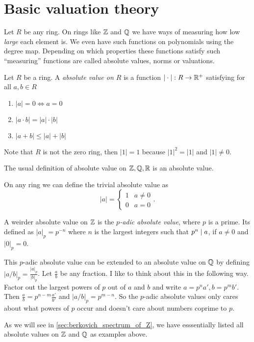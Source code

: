 
\section{Basic valuation theory} \label{sec:basic_valuation_theory}

Let $R$ be any ring. On rings like $\mathbb{Z}$ and $\mathbb{Q}$ we have ways of measuring how low \emph{large} each element is. We even have such functions on polynomials using the degree map. Depending on which properties these functions satisfy such ``measuring'' functions are called absolute values, norms or valuations. 
\begin{definition}
	Let $R$ be a ring. A \emph{absolute value on $R$} is a function $|\cdot |: R \to \mathbb{R}^{+}$ satisfying for all $a, b \in R$
	\begin{enumerate}
		\item $|a| = 0 \iff a = 0$ 
		\item $|a \cdot b| = |a| \cdot |b|$ 
		\item $|a + b| \le |a| + |b|$
	\end{enumerate}
\end{definition}
Note that $R$ is not the zero ring, then $|1| = 1$ because $|1|^2 = |1| $ and $|1|\ne 0 $. 
\begin{example}
	The usual definition of absolute value on $\mathbb{Z}, \mathbb{Q}, \mathbb{R}$ is an absolute value. 
\end{example}
\begin{example}
	On any ring we can define the trivial absolute value as \[
	 |a| = \begin{cases}
		 1 & a \ne 0 \\
		 0 & a = 0
	 \end{cases}
	.\] 
\end{example}
\begin{example}
	A weirder absolute value on $\mathbb{Z}$ is the \emph{$p$-adic absolute value}, where $p$ is a prime. 
	Its defined as $|a|_p = p^{-n}$ where $n$ is the largest integers such that $p^{n} \mid a$, if $a \ne 0$ and $|0|_p = 0$. 


	This $p$-adic absolute value can be extended to an absolute value on $\mathbb{Q}$ by defining $|a / b|_p = \frac{|a|_p}{|b|_p}$. Let $\frac{a}{b}$ be any fraction. 
	I like to think about this in the following way. 
	Factor out the largest powers of $p$ out of $a$ and $b$ and write $a = p^{n} a', b = p^{m} b'$. Then $\frac{a}{ b} = p^{n - m} \frac{a'}{ b'}$ and $|a / b|_p = p^{m - n}$. 
	So the $p$-adic absolute values only cares about what powers of $p$ occur and doesn't care about numbers coprime to $p $.
\end{example}
As we will see in \cref{sec:berkovich_spectrum_of_Z}, we have esssentially listed all absolute values on $\mathbb{Z}$ and $\mathbb{Q}$ as examples above.  

